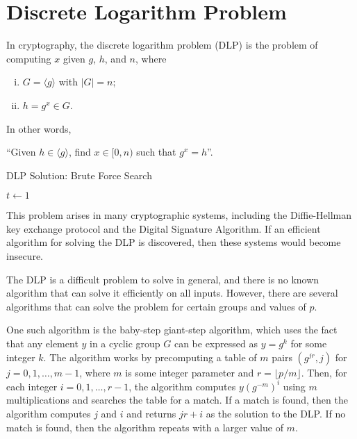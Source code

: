 \documentclass[12pt,openany]{book}
\theoremstyle{definition}
\newcommand{\set}[1]{\left\{#1\right\}}
\newcommand{\abs}[1]{\left\lvert #1 \right\rvert}
\begin{document}
	
	\newpage
	\chapter{Discrete Logarithm Problem}
	In cryptography, the discrete logarithm problem (DLP) is the problem of computing $x$ given $g$, $h$, and $n$, where \begin{enumerate}[(i)]
		\item $G=\langle g\rangle$ with $\abs{G}=n$;
		\item $h=g^x\in G$.
	\end{enumerate} In other words,  \begin{center}
		``Given $h\in\langle g\rangle$, find $x\in[0,n)$ such that $g^x=h$''.
	\end{center}

	\begin{algorithm}[H]
		\caption{DLP Solution: Brute Force Search}
		\KwResult{$x\in\set{0,1,\cdots, n-1}$ such that $g^x=h$.}
		\vspace{4pt}
		\vspace{4pt}
		$t\gets 1$\;
		\vspace{4pt}
	\end{algorithm}
	
	This problem arises in many cryptographic systems, including the Diffie-Hellman key exchange protocol and the Digital Signature Algorithm. If an efficient algorithm for solving the DLP is discovered, then these systems would become insecure.
	
	The DLP is a difficult problem to solve in general, and there is no known algorithm that can solve it efficiently on all inputs. However, there are several algorithms that can solve the problem for certain groups and values of $p$.
	
	One such algorithm is the baby-step giant-step algorithm, which uses the fact that any element $y$ in a cyclic group $G$ can be expressed as $y = g^k$ for some integer $k$. The algorithm works by precomputing a table of $m$ pairs $(g^{jr}, j)$ for $j=0,1,\ldots, m-1$, where $m$ is some integer parameter and $r = \lfloor p/m\rfloor$. Then, for each integer $i=0,1,\ldots, r-1$, the algorithm computes $y(g^{-m})^i$ using $m$ multiplications and searches the table for a match. If a match is found, then the algorithm computes $j$ and $i$ and returns $jr + i$ as the solution to the DLP. If no match is found, then the algorithm repeats with a larger value of $m$.
	
\end{document}
